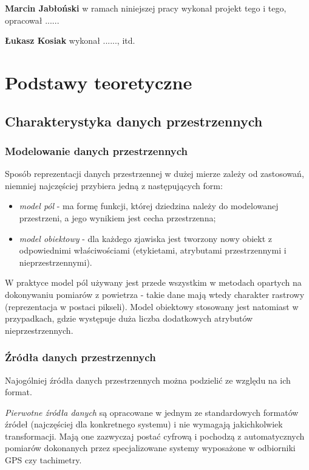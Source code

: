 \documentclass[12pt]{article}
\begin{document}
\textbf{Marcin Jabłoński} w ramach niniejszej pracy wykonał projekt tego i tego, opracował ......

\textbf{Łukasz Kosiak} wykonał ......, itd.

\newpage

\section{Podstawy teoretyczne}

\subsection{Charakterystyka danych przestrzennych}

\subsubsection{Modelowanie danych przestrzennych}

Sposób reprezentacji danych przestrzennej w dużej mierze zależy od zastosowań, niemniej najczęściej przybiera jedną z następujących form:

\begin{itemize}
\item \textit{model pól} - ma formę funkcji, której dziedzina należy do modelowanej przestrzeni, a jego wynikiem jest cecha przestrzenna;
\item \textit{model obiektowy} - dla każdego zjawiska jest tworzony nowy obiekt z odpowiednimi właściwościami (etykietami, atrybutami przestrzennymi i nieprzestrzennymi).
\end{itemize}

W praktyce model pól używany jest przede wszystkim w metodach opartych na dokonywaniu pomiarów z powietrza - takie dane mają wtedy charakter rastrowy (reprezentacja w postaci pikseli). Model obiektowy stosowany jest natomiast w przypadkach, gdzie występuje duża liczba dodatkowych atrybutów nieprzestrzennych.

\subsubsection{Źródła danych przestrzennych}

Najogólniej źródła danych przestrzennych można podzielić ze względu na ich format.

\textit{Pierwotne źródła danych} są opracowane w jednym ze standardowych formatów źródeł (najczęściej dla konkretnego systemu) i nie wymagają jakichkolwiek transformacji. Mają one zazwyczaj postać cyfrową i pochodzą z automatycznych pomiarów dokonanych przez specjalizowane systemy wyposażone w odbiorniki GPS czy tachimetry.
\end{document}
